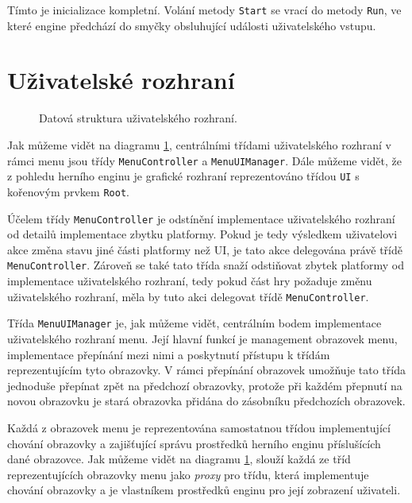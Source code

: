 Tímto je inicializace kompletní. Volání metody \texttt{Start} se vrací do metody \texttt{Run}, ve které engine předchází do smyčky obsluhující události uživatelského vstupu.

\section{Uživatelské rozhraní}

\begin{figure}[h]
	\centering
	\fontsize{8pt}{11pt}\selectfont
	\def\svgwidth{\textwidth}
	
	\caption{Datová struktura uživatelského rozhraní.}
	\label{fig:uireferences}
\end{figure}

Jak můžeme vidět na diagramu \ref{fig:uireferences}, centrálními třídami uživatelského rozhraní v rámci menu jsou třídy \texttt{MenuController} a \texttt{MenuUIManager}. Dále můžeme vidět, že z pohledu herního enginu je grafické rozhraní reprezentováno třídou \texttt{UI} s kořenovým prvkem \texttt{Root}.

Účelem třídy \texttt{MenuController} je odstínění implementace uživatelského rozhraní od detailů implementace zbytku platformy. Pokud je tedy výsledkem uživatelovi akce změna stavu jiné části platformy než UI, je tato akce delegována právě třídě \texttt{MenuController}. Zároveň se také tato třída snaží odstiňovat zbytek platformy od implementace uživatelského rozhraní, tedy pokud část hry požaduje změnu uživatelského rozhraní, měla by tuto akci delegovat třídě \texttt{MenuController}.

Třída \texttt{MenuUIManager} je, jak můžeme vidět, centrálním bodem implementace uživatelského rozhraní menu. Její hlavní funkcí je management obrazovek menu, implementace přepínání mezi nimi a poskytnutí přístupu k třídám reprezentujícím tyto obrazovky. V rámci přepínání obrazovek umožňuje tato třída jednoduše přepínat zpět na předchozí obrazovky, protože při každém přepnutí na novou obrazovku je stará obrazovka přidána do zásobníku předchozích obrazovek.

Každá z obrazovek menu je reprezentována samostatnou třídou implementující chování obrazovky a zajišťující správu prostředků herního enginu příslušících dané obrazovce. Jak můžeme vidět na diagramu \ref{fig:uireferences}, slouží každá ze tříd reprezentujících obrazovky menu jako \textit{proxy} pro třídu, která implementuje chování obrazovky a je vlastníkem prostředků enginu pro její zobrazení uživateli. 

